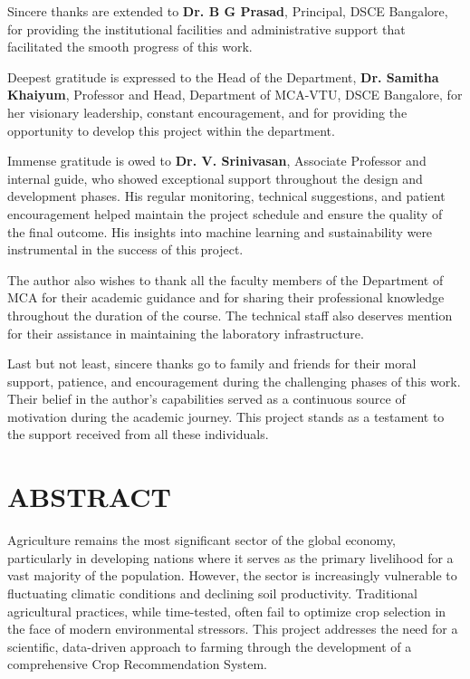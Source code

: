 \documentclass[12pt,a4paper]{report}
\begin{document}
Sincere thanks are extended to \textbf{Dr. B G Prasad}, Principal, DSCE Bangalore, for providing the institutional facilities and administrative support that facilitated the smooth progress of this work.

Deepest gratitude is expressed to the Head of the Department, \textbf{Dr. Samitha Khaiyum}, Professor and Head, Department of MCA-VTU, DSCE Bangalore, for her visionary leadership, constant encouragement, and for providing the opportunity to develop this project within the department.

Immense gratitude is owed to \textbf{Dr. V. Srinivasan}, Associate Professor and internal guide, who showed exceptional support throughout the design and development phases. His regular monitoring, technical suggestions, and patient encouragement helped maintain the project schedule and ensure the quality of the final outcome. His insights into machine learning and sustainability were instrumental in the success of this project.

The author also wishes to thank all the faculty members of the Department of MCA for their academic guidance and for sharing their professional knowledge throughout the duration of the course. The technical staff also deserves mention for their assistance in maintaining the laboratory infrastructure.

Last but not least, sincere thanks go to family and friends for their moral support, patience, and encouragement during the challenging phases of this work. Their belief in the author's capabilities served as a continuous source of motivation during the academic journey. This project stands as a testament to the support received from all these individuals.


\newpage

\chapter*{ABSTRACT}
\label{ch:abstract} %

Agriculture remains the most significant sector of the global economy, particularly in developing nations where it serves as the primary livelihood for a vast majority of the population. However, the sector is increasingly vulnerable to fluctuating climatic conditions and declining soil productivity. Traditional agricultural practices, while time-tested, often fail to optimize crop selection in the face of modern environmental stressors. This project addresses the need for a scientific, data-driven approach to farming through the development of a comprehensive Crop Recommendation System.
\end{document}
